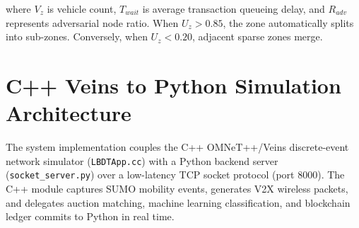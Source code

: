 \noindent where $V_z$ is vehicle count, $T_{wait}$ is average transaction queueing delay, and $R_{adv}$ represents adversarial node ratio. When $U_z > 0.85$, the zone automatically splits into sub-zones. Conversely, when $U_z < 0.20$, adjacent sparse zones merge.

\section{C++ Veins to Python Simulation Architecture}\label{sec:method_integration}
\noindent The system implementation couples the C++ OMNeT++/Veins discrete-event network simulator (\texttt{LBDTApp.cc}) with a Python backend server (\texttt{socket\_server.py}) over a low-latency TCP socket protocol (port 8000). The C++ module captures SUMO mobility events, generates V2X wireless packets, and delegates auction matching, machine learning classification, and blockchain ledger commits to Python in real time.